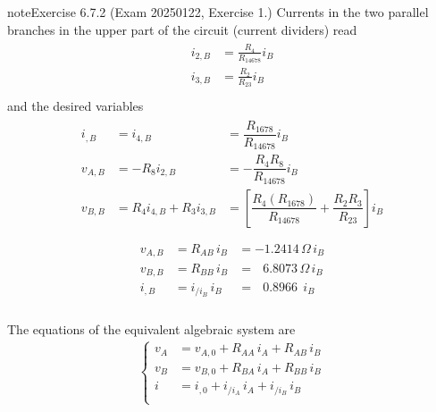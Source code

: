 \documentclass[letterpaper,10pt,english]{jupyterBook}
\begin{document}
\begin{sphinxadmonition}{note}{Exercise 6.7.2 (Exam 2025\sphinxhyphen{}01\sphinxhyphen{}22, Exercise 1.)}
\sphinxAtStartPar
Currents in the two parallel branches in the upper part of the circuit (current dividers) read
\begin{equation*}
\begin{split}\begin{aligned}
  i_{2,B} & = \frac{R_4}{R_{14678}} i_B \\
  i_{3,B} & = \frac{R_2}{R_{23}} i_B \\
\end{aligned}\end{split}
\end{equation*}
\sphinxAtStartPar
and the desired variables
\begin{equation*}
\begin{split}\begin{aligned}
  i_{,B}  & = i_{4,B} & = \dfrac{R_{1678}}{R_{14678}} i_B \\
  v_{A,B} & = - R_8 i_{2,B} & = - \dfrac{R_4 R_8}{R_{14678}} i_B  \\
  v_{B,B} & = R_4 i_{4,B} + R_3 i_{3,B} & = \left[ \dfrac{R_4(R_{1678})}{R_{14678}} + \dfrac{R_2 R_3}{R_{23}} \right] i_B \\
\end{aligned}\end{split}
\end{equation*}\begin{equation*}
\begin{split}\begin{aligned}
 v_{A,B} & = R_{AB}   \, i_B & =     - 1.2414  \, \Omega \, i_B \\ 
 v_{B,B} & = R_{BB}   \, i_B & = \ \ \ 6.8073  \, \Omega \, i_B \\
   i_{,B}& = i_{/i_B} \, i_B & = \ \ \ 0.8966 \ \          i_B \\
\end{aligned}\end{split}
\end{equation*}
\begin{figure}[htbp]
\centering

\noindent{}
\end{figure}

\sphinxAtStartPar
The equations of the equivalent algebraic system are
\begin{equation*}
\begin{split}\begin{cases}
 v_A & = v_{A,0} + R_{AA}   \, i_A + R_{AB}   \, i_B \\
 v_B & = v_{B,0} + R_{BA}   \, i_A + R_{BB}   \, i_B \\
 i   & = i_{ ,0} + i_{/i_A} \, i_A + i_{/i_B} \, i_B \\
\end{cases}\end{split}
\end{equation*}



\end{sphinxadmonition}
\end{document}
